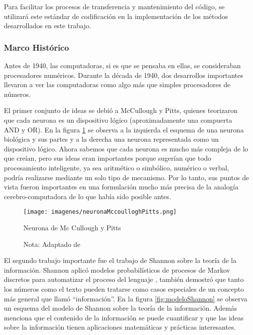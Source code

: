 \documentclass[12pt]{article}
\begin{document}
			Para facilitar los procesos de transferencia y mantenimiento del código, se utilizará este estándar de codificación en la implementación de los métodos desarrollados en este trabajo.
			
			\subsubsection{Marco Histórico}
			Antes de 1940, las computadoras, si es que se pensaba en ellas, se consideraban procesadores numéricos. Durante la década de 1940, dos desarrollos importantes llevaron a ver las computadoras como algo más que simples procesadores de números. \cite{Lehnert2014}
			
			El primer conjunto de ideas se debió a McCullough y Pitts, quienes teorizaron que cada neurona es un dispositivo lógico (aproximadamente una compuerta AND y OR). En la figura \ref{fig:neuronaMcCulloghPitts} se observa a la izquierda el esquema de una neurona biológica y sus partes y a la derecha una neurona representada como un dispositivo lógico. Ahora sabemos que cada neurona es mucho más compleja de lo que creían, pero sus ideas eran importantes porque sugerían que todo procesamiento inteligente, ya sea aritmético o simbólico, numérico o verbal, podría realizarse mediante un solo tipo de mecanismo. Por lo tanto, sus puntos de vista fueron importantes en una formulación mucho más precisa de la analogía cerebro-computadora de lo que había sido posible antes.\cite{Lehnert2014}
					
			\begin{figure}[H]
				\texttt{[image: imagenes/neuronaMccoulloghPitts.png]}
				\centering
				\caption{Neurona de Mc Cullough y Pitts }
				\caption*{\small Nota: Adaptado de \cite{Manevitz2007}}
				\label{fig:neuronaMcCulloghPitts}
			\end{figure}		
			
			
			El segundo trabajo importante fue el trabajo de Shannon sobre la teoría de la información. Shannon aplicó modelos probabilísticos de procesos de Markov discretos para automatizar el proceso del lenguaje \cite{Kumar2011}, también demostró que tanto los números como el texto pueden tratarse como casos especiales de un concepto más general que llamó ``información''. En la figura \ref{fig:modeloShannon} se observa un esquema del modelo de Shannon sobre la teoría de la información. Además menciona que el contenido de la información se puede cuantificar y que las ideas sobre la información tienen aplicaciones matemáticas y prácticas interesantes.\cite{Lehnert2014}
				
\end{document}
